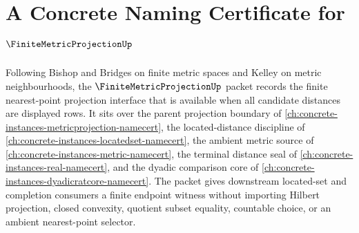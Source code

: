 \chapter{A Concrete Naming Certificate for $\FiniteMetricProjectionUp$}
\label{ch:concrete-instances-finite-metric-projection-namecert}

Following Bishop and Bridges on finite metric spaces and Kelley on metric neighbourhoods, the $\FiniteMetricProjectionUp$ packet records the finite nearest-point projection interface that is available when all candidate distances are displayed rows. It sits over the parent projection boundary of \autoref{ch:concrete-instances-metricprojection-namecert}, the located-distance discipline of \autoref{ch:concrete-instances-locatedset-namecert}, the ambient metric source of \autoref{ch:concrete-instances-metric-namecert}, the terminal distance seal of \autoref{ch:concrete-instances-real-namecert}, and the dyadic comparison core of \autoref{ch:concrete-instances-dyadicratcore-namecert}. The packet gives downstream located-set and completion consumers a finite endpoint witness without importing Hilbert projection, closed convexity, quotient subset equality, countable choice, or an ambient nearest-point selector.

